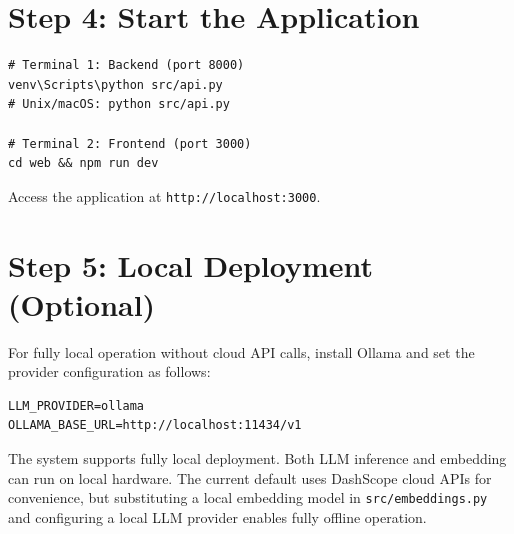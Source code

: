 \documentclass[11pt,a4paper]{report}
\begin{document}
\section*{Step 4: Start the Application}
\begin{verbatim}
# Terminal 1: Backend (port 8000)
venv\Scripts\python src/api.py
# Unix/macOS: python src/api.py

# Terminal 2: Frontend (port 3000)
cd web && npm run dev
\end{verbatim}
Access the application at \texttt{http://localhost:3000}.

\section*{Step 5: Local Deployment (Optional)}
For fully local operation without cloud API calls, install Ollama and set the provider configuration as follows:
\begin{verbatim}
LLM_PROVIDER=ollama
OLLAMA_BASE_URL=http://localhost:11434/v1
\end{verbatim}
The system supports fully local deployment. Both LLM inference and embedding can run on local hardware. The current default uses DashScope cloud APIs for convenience, but substituting a local embedding model in \texttt{src/embeddings.py} and configuring a local LLM provider enables fully offline operation.
\end{document}

